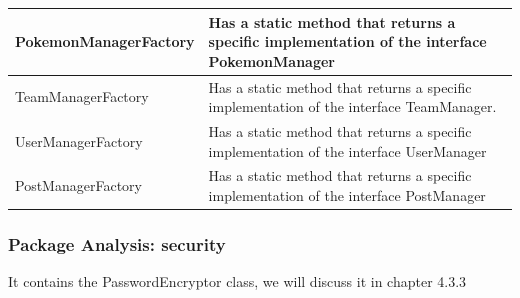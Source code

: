\begin{center}
\begin{longtable}{| m{14em} | m{19em} |}
		\hline
		PokemonManagerFactory & Has a static method that returns a specific implementation of the interface PokemonManager\\
		\hline
		TeamManagerFactory & Has a static method that returns a specific implementation of the interface TeamManager.\\
		\hline
		UserManagerFactory & Has a static method that returns a specific implementation of the interface UserManager\\
		\hline
		PostManagerFactory & Has a static method that returns a specific implementation of the interface PostManager\\
		\hline
	\end{longtable}
\end{center}
\endgroup


\subsubsection{Package Analysis: security}
It contains the PasswordEncryptor class, we will discuss it in chapter 4.3.3


